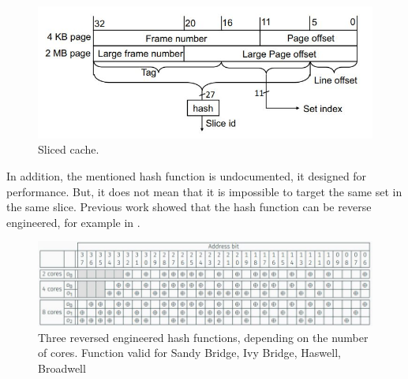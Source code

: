 \begin{figure}[!ht]
    \centering
    \includegraphics[width=\textwidth]{images/slicedcache.JPG}
    \caption{Sliced cache.}
    \label{fig:slicedcache}
\end{figure}

In addition, the mentioned hash function is undocumented, it designed for performance. But, it does not mean that it is impossible to target the same set in the same slice. Previous work \cite{EURECOM+4671} showed that the hash function can be reverse engineered, for example in .

\begin{figure}[!ht]
    \centering
    \includegraphics[width=\textwidth]{images/hashfunc.JPG}
    \caption{Three reversed engineered hash functions, depending on the number of cores. Function valid for Sandy Bridge, Ivy Bridge, Haswell, Broadwell}
    \label{fig:hashfunc}
\end{figure}

